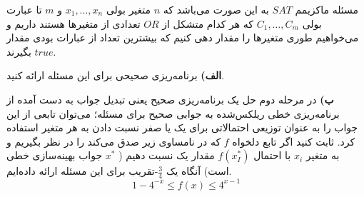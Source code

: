 مسئله ماکزیمم
$SAT$
به این صورت می‌باشد که
$n$
متغیر بولی
$x_1, \ldots, x_n$
و
$m$
تا عبارت بولی
$C_1, \ldots, C_m$
که هر کدام متشکل از
$OR$
تعدادی از متغیرها هستند داریم و می‌خواهیم طوری متغیرها را مقدار دهی کنیم که بیشترین تعداد از عبارات بودی مقدار
$true$
بگیرند.

\vspace*{10pt}
\textbf{الف)}
برنامه‌ریزی صحیحی برای این مسئله ارائه کنید.

\vspace*{5pt}
\textbf{ب)}
در مرحله دوم حل یک برنامه‌ریزی صحیح یعنی تبدیل جواب به دست آمده از برنامه‌ریزی خطی ریلکس‌شده به جوابی صحیح برای مسئله؛ می‌توان تابعی از این جواب را به عنوان توزیعی احتمالاتی برای یک یا صفر نسبت دادن به هر متغیر استفاده کرد. ثابت کنید اگر تابع دلخواه
$f$
که در نامساوی زیر صدق می‌کند را در نظر بگیریم و به متغیر
$x_i$
با احتمال
$f(x_{I}^{*})$
مقدار یک نسبت دهیم (
$x^{*}$
جواب بهینه‌سازی خطی است) آنگاه یک
$\frac{3}{4}$-تقریب
برای این مسئله ارائه داده‌ایم.
\[
    1 - 4^{-x} \leq f(x) \leq 4^{x - 1}    
\]